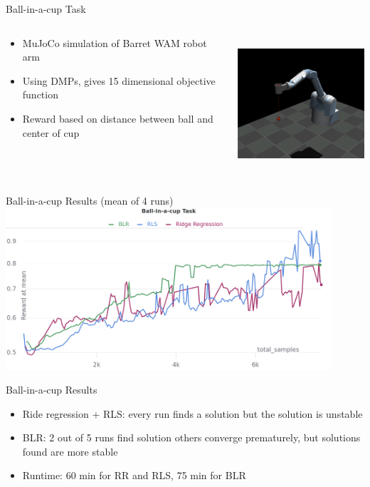 \documentclass[navbarinfooter, 12pt]{sdqbeamer}
\begin{document}
\begin{frame}{Ball-in-a-cup Task}
  \begin{columns}[c]
    \begin{column}{8cm}
      \begin{itemize}
      \item MuJoCo simulation of Barret WAM robot arm
      \item Using DMPs, gives 15 dimensional objective function
      \item Reward based on distance between ball and center of cup
      \end{itemize}
    \end{column}
    \begin{column}{5cm}
      \includegraphics[height=5cm]{figures/ball_in_a_cup.png}
    \end{column}
  \end{columns}
\end{frame}


\begin{frame}{Ball-in-a-cup Results (mean of 4 runs)}
  \centering
  \includegraphics[height=6cm]{figures/cup_results.png}
\end{frame}

\begin{frame}{Ball-in-a-cup Results}
\begin{itemize}
\item Ride regression + RLS: every run finds a solution but the solution is unstable
\item BLR: 2 out of 5 runs find solution others converge prematurely, but
  solutions found are more stable
\item Runtime: 60 min for RR and RLS, 75 min for BLR
\end{itemize}
\end{frame}
\end{document}

